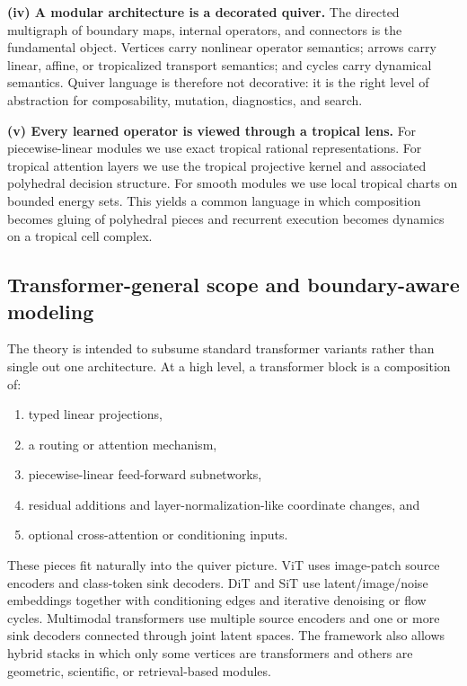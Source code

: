 \documentclass[11pt]{article}
\theoremstyle{definition}
\theoremstyle{plain}
\theoremstyle{remark}
\begin{document}
\textbf{(iv) A modular architecture is a decorated quiver.}
The directed multigraph of boundary maps, internal operators, and connectors is the fundamental object.
Vertices carry nonlinear operator semantics; arrows carry linear, affine, or tropicalized transport semantics; and cycles carry dynamical semantics.
Quiver language is therefore not decorative:
it is the right level of abstraction for composability, mutation, diagnostics, and search.

\textbf{(v) Every learned operator is viewed through a tropical lens.}
For piecewise-linear modules we use exact tropical rational representations.
For tropical attention layers we use the tropical projective kernel and associated polyhedral decision structure.
For smooth modules we use local tropical charts on bounded energy sets.
This yields a common language in which composition becomes gluing of polyhedral pieces and recurrent execution becomes dynamics on a tropical cell complex.

\subsection{Transformer-general scope and boundary-aware modeling}
\label{sec:transformer-scope}

The theory is intended to subsume standard transformer variants rather than single out one architecture.
At a high level, a transformer block is a composition of:
\begin{enumerate}[leftmargin=2em]
\item typed linear projections,
\item a routing or attention mechanism,
\item piecewise-linear feed-forward subnetworks,
\item residual additions and layer-normalization-like coordinate changes, and
\item optional cross-attention or conditioning inputs.
\end{enumerate}
These pieces fit naturally into the quiver picture.
ViT uses image-patch source encoders and class-token sink decoders.
DiT and SiT use latent/image/noise embeddings together with conditioning edges and iterative denoising or flow cycles.
Multimodal transformers use multiple source encoders and one or more sink decoders connected through joint latent spaces.
The framework also allows hybrid stacks in which only some vertices are transformers and others are geometric, scientific, or retrieval-based modules.
\end{document}
